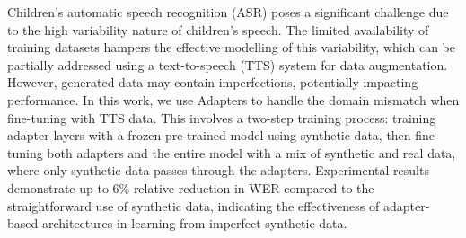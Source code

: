 \label{chap:6}
\cleardoublepage
Children's automatic speech recognition (ASR) poses a significant challenge due to the high variability nature of children's speech. The limited availability of training datasets hampers the effective modelling of this variability, which can be partially addressed using a text-to-speech (TTS) system for data augmentation. However, generated data may contain imperfections, potentially impacting performance. In this work, we use Adapters to handle the domain mismatch when fine-tuning with TTS data. This involves a two-step training process: training adapter layers with a frozen pre-trained model using synthetic data, then fine-tuning both adapters and the entire model with a mix of synthetic and real data, where only synthetic data passes through the adapters. Experimental results demonstrate up to 6\% relative reduction in WER compared to the straightforward use of synthetic data, indicating the effectiveness of adapter-based architectures in learning from imperfect synthetic data.

